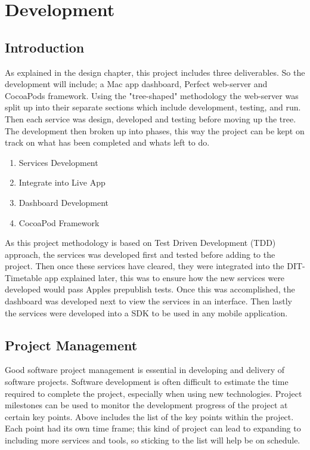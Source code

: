 \chapter{Development}

\label{ch:conclusions}

\section{Introduction}

As explained in the design chapter, this project includes three deliverables. So the development will include; a Mac app dashboard, Perfect web-server and CocoaPods framework. Using the "tree-shaped" methodology the web-server was split up into their separate sections which include development, testing, and run. Then each service was design, developed and testing before moving up the tree. The development then broken up into phases, this way the project can be kept on track on what has been completed and whats left to do.

\begin{enumerate}
  \item Services Development
  \item Integrate into Live App
  \item Dashboard Development
  \item CocoaPod Framework 
\end{enumerate}

As this project methodology is based on Test Driven Development (TDD) approach, the services was developed first and tested before adding to the project. Then once these services have cleared, they were integrated into the DIT-Timetable app explained later, this was to ensure how the new services were developed would pass Apples prepublish tests. Once this was accomplished, the dashboard was developed next to view the services in an interface. Then lastly the services were developed into a SDK to be used in any mobile application.

\section{Project Management}

Good software project management is essential in developing and delivery of software projects. Software development is often difficult to estimate the time required to complete the project, especially when using new technologies. Project milestones can be used to monitor the development progress of the project at certain key points. Above includes the list of the key points within the project. Each point had its own time frame; this kind of project can lead to expanding to including more services and tools, so sticking to the list will help be on schedule.

